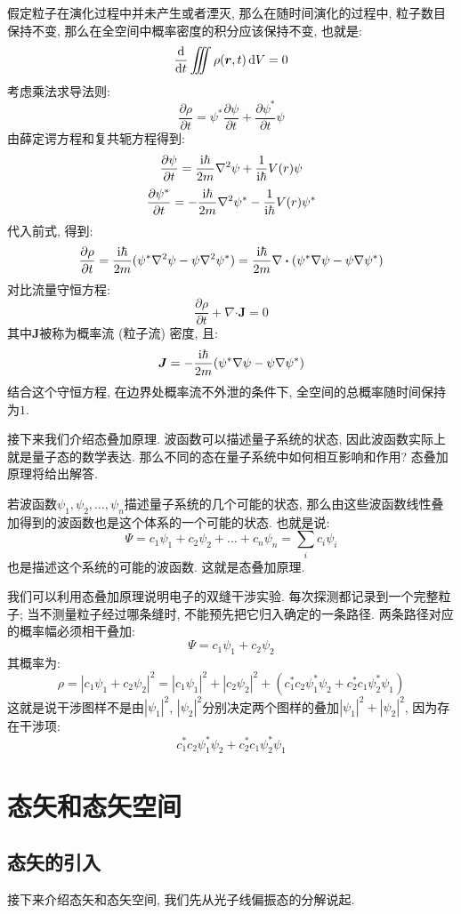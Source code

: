 假定粒子在演化过程中并未产生或者湮灭, 那么在随时间演化的过程中, 粒子数目保持不变, 那么在全空间中概率密度的积分应该保持不变, 也就是:
\[
\frac{\mathop{}\!\mathrm{d}}{\mathop{}\!\mathrm{d} t}\iiint \rho(\bm{r}, t)\mathop{}\!\mathrm{d} V =0
\]
考虑乘法求导法则:
\[
\frac{\partial \rho}{\partial t} = \psi^* \frac{\partial \psi}{\partial t} + \frac{\partial \psi^*}{\partial t} \psi
\]
由薛定谔方程和复共轭方程得到:
\[
\frac{\partial \psi}{\partial t} = \frac{\mathop{}\!\mathrm{i}\hbar}{2m} \nabla^2 \psi + \frac{1}{\mathop{}\!\mathrm{i}\hbar} V(r) \psi
\]
\[
\frac{\partial \psi^*}{\partial t} = -\frac{\mathop{}\!\mathrm{i}\hbar}{2m} \nabla^2 \psi^* - \frac{1}{\mathop{}\!\mathrm{i}\hbar} V(r) \psi^*
\]
代入前式, 得到:
\[
\frac{\partial \rho}{\partial t} = \frac{\mathop{}\!\mathrm{i}\hbar}{2m} (\psi^* \nabla^2 \psi - \psi \nabla^2 \psi^*) = \frac{\mathop{}\!\mathrm{i}\hbar}{2m} \nabla \bm{\cdot} (\psi^* \nabla \psi - \psi \nabla \psi^*)
\]
对比流量守恒方程:
\[
\frac{\partial \rho}{\partial t}+\nabla \bm{\cdot} \bm{J} = 0
\]
其中$\bm{J}$被称为概率流 (粒子流) 密度, 且:
\[
\bm{J} = -\frac{\mathop{}\!\mathrm{i}\hbar}{2m} (\psi^* \nabla \psi - \psi \nabla \psi^*)
\]
结合这个守恒方程, 在边界处概率流不外泄的条件下, 全空间的总概率随时间保持为$1$.

接下来我们介绍态叠加原理. 波函数可以描述量子系统的状态, 因此波函数实际上就是量子态的数学表达. 那么不同的态在量子系统中如何相互影响和作用? 态叠加原理将给出解答.

若波函数$\psi_1, \psi_2, \dots, \psi_n$描述量子系统的几个可能的状态, 那么由这些波函数线性叠加得到的波函数也是这个体系的一个可能的状态. 也就是说:
\[
\Psi = c_1\psi_1+c_2\psi_2+\dots+c_n\psi_n = \sum_i c_i \psi_i
\]
也是描述这个系统的可能的波函数. 这就是态叠加原理.

我们可以利用态叠加原理说明电子的双缝干涉实验. 每次探测都记录到一个完整粒子; 当不测量粒子经过哪条缝时, 不能预先把它归入确定的一条路径. 两条路径对应的概率幅必须相干叠加:
\[
\Psi = c_1\psi_1+c_2\psi_2
\]
其概率为:
\[
\rho = |c_1\psi_1+c_2\psi_2|^2= |c_1\psi_1|^2+|c_2 \psi_2|^2+(c_1^*c_2\psi_1^*\psi_2+c_2^*c_1\psi_2^*\psi_1)
\]
这就是说干涉图样不是由$|\psi_1|^2$, $|\psi_2|^2$分别决定两个图样的叠加$|\psi_1|^2+|\psi_2|^2$, 因为存在干涉项:
\[
c_1^*c_2\psi_1^*\psi_2+c_2^*c_1\psi_2^*\psi_1
\]

\section{态矢和态矢空间}
\subsection{态矢的引入}
接下来介绍态矢和态矢空间, 我们先从光子线偏振态的分解说起.

